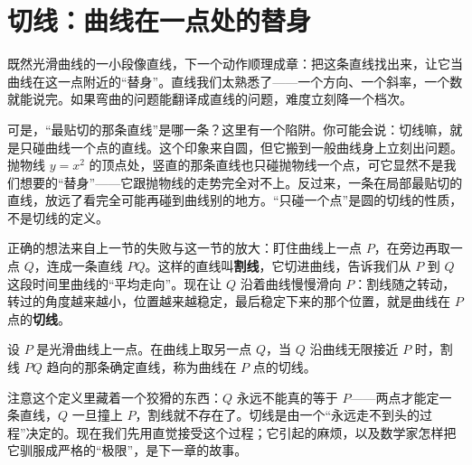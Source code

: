 \section{切线：曲线在一点处的替身}

既然光滑曲线的一小段像直线，下一个动作顺理成章：把这条直线找出来，让它当曲线在这一点附近的``替身''。直线我们太熟悉了——一个方向、一个斜率，一个数就能说完。如果弯曲的问题能翻译成直线的问题，难度立刻降一个档次。

可是，``最贴切的那条直线''是哪一条？这里有一个陷阱。你可能会说：切线嘛，就是只碰曲线一个点的直线。这个印象来自圆，但它搬到一般曲线身上立刻出问题。抛物线 $y=x^2$ 的顶点处，竖直的那条直线也只碰抛物线一个点，可它显然不是我们想要的``替身''——它跟抛物线的走势完全对不上。反过来，一条在局部最贴切的直线，放远了看完全可能再碰到曲线别的地方。``只碰一个点''是圆的切线的性质，不是切线的定义。

正确的想法来自上一节的失败与这一节的放大：盯住曲线上一点 $P$，在旁边再取一点 $Q$，连成一条直线 $PQ$。这样的直线叫\textbf{割线}，它切进曲线，告诉我们从 $P$ 到 $Q$ 这段时间里曲线的``平均走向''。现在让 $Q$ 沿着曲线慢慢滑向 $P$：割线随之转动，转过的角度越来越小，位置越来越稳定，最后稳定下来的那个位置，就是曲线在 $P$ 点的\textbf{切线}。

\begin{center}
\end{center}

\begin{dingyi}[切线的直观定义]
设 $P$ 是光滑曲线上一点。在曲线上取另一点 $Q$，当 $Q$ 沿曲线无限接近 $P$ 时，割线 $PQ$ 趋向的那条确定直线，称为曲线在 $P$ 点的切线。
\end{dingyi}

注意这个定义里藏着一个狡猾的东西：$Q$ 永远不能真的等于 $P$——两点才能定一条直线，$Q$ 一旦撞上 $P$，割线就不存在了。切线是由一个``永远走不到头的过程''决定的。现在我们先用直觉接受这个过程；它引起的麻烦，以及数学家怎样把它驯服成严格的``极限''，是下一章的故事。

